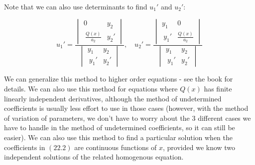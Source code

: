 \documentclass{article}
\begin{document}
Note that we can also use determinants to find ${u_1}'$ and ${u_2}'$:

\[ {u_1}' = \frac{\begin{vmatrix} 0 & y_2 \\\ \frac{Q(x)}{a_2} & {y_2}' \end{vmatrix}}{\begin{vmatrix} y_1 & y_2 \\\ {y_1}' & {y_2}' \end{vmatrix}}, \quad {u_2}' = \frac{\begin{vmatrix} y_1 & 0 \\\ {y_1}' & \frac{Q(x)}{a_2} \end{vmatrix}}{\begin{vmatrix} y_1 & y_2 \\\ {y_1}' & {y_2}' \end{vmatrix}} \]

We can generalize this method to higher order equations - see the book for details. We can also use this method for equations where $Q(x)$ has finite linearly independent derivatives, although the method of undetermined coefficients is usually less effort to use in those cases (however, with the method of variation of parameters, we don't have to worry about the 3 different cases we have to handle in the method of undetermined coefficients, so it can still be easier). We can also use this method to find a particular solution when the coefficients in $(22.2)$ are \@{continuous} functions of $x$, provided we know two independent solutions of the related homogenous equation.
\end{document}
